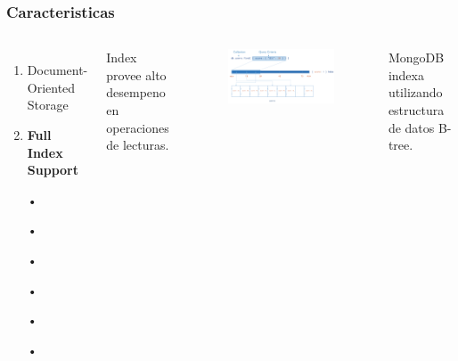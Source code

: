 \documentclass{beamer}
\begin{document}
\begin{frame}
\frametitle{Caracteristicas}
\begin{columns}[c] %

\begin{enumerate}
\item Document-Oriented Storage
\item \textbf{Full Index Support}
\item[•]	
\item[•]	
\item[•]	
\item[•]	
\item[•]	
\item[•]	
\end{enumerate}

Index provee alto desempeno en operaciones de lecturas.
\begin{figure}
\includegraphics[width=1\linewidth]{index-with-query.png}
\end{figure}
MongoDB indexa utilizando estructura de datos B-tree.
\end{columns}
\end{frame}
\end{document}
